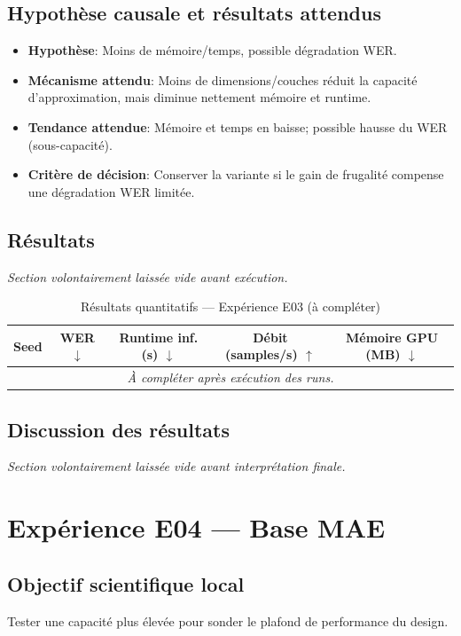 \documentclass[11pt,a4paper]{article}
\begin{document}
\subsection{Hypothèse causale et résultats attendus}
\begin{itemize}[leftmargin=1.2cm]
\item \textbf{Hypothèse}: Moins de mémoire/temps, possible dégradation WER.
\item \textbf{Mécanisme attendu}: Moins de dimensions/couches réduit la capacité d'approximation, mais diminue nettement mémoire et runtime.
\item \textbf{Tendance attendue}: Mémoire et temps en baisse; possible hausse du WER (sous-capacité).
\item \textbf{Critère de décision}: Conserver la variante si le gain de frugalité compense une dégradation WER limitée.
\end{itemize}

\subsection{Résultats}
\textit{Section volontairement laissée vide avant exécution.}

\begin{table}[H]
\centering
\caption{Résultats quantitatifs --- Expérience E03 (à compléter)}
\begin{tabular}{lcccc}
\toprule
Seed & WER $\downarrow$ & Runtime inf. (s) $\downarrow$ & Débit (samples/s) $\uparrow$ & Mémoire GPU (MB) $\downarrow$ \\
\midrule
\multicolumn{5}{c}{\textit{À compléter après exécution des runs.}} \\
\bottomrule
\end{tabular}
\end{table}

\subsection{Discussion des résultats}
\textit{Section volontairement laissée vide avant interprétation finale.}


\section{Expérience E04 --- Base MAE}
\subsection{Objectif scientifique local}
Tester une capacité plus élevée pour sonder le plafond de performance du design.
\end{document}
